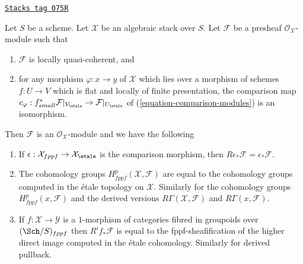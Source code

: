 \begin{lemma}
\label{stacks-sheaves-lemma-compare-fppf-etale}
\href{https://stacks.math.columbia.edu/tag/075R}{\texttt{Stacks tag 075R}}

Let $S$ be a scheme. Let $\mathcal{X}$ be an algebraic stack over $S$.
Let $\mathcal{F}$ be a presheaf $\mathcal{O}_\mathcal{X}$-module such that
\begin{enumerate}
\item[(a)] $\mathcal{F}$ is locally quasi-coherent, and
\item[(b)] for any morphism $\varphi : x \to y$ of $\mathcal{X}$ which lies
over a morphism of schemes $f : U \to V$ which is flat and
locally of finite presentation, the comparison map
$c_\varphi : f_{small}^*\mathcal{F}|_{V_\etale} \to
\mathcal{F}|_{U_\etale}$ of
(\ref{equation-comparison-modules}) is an isomorphism.
\end{enumerate}
Then $\mathcal{F}$ is an $\mathcal{O}_\mathcal{X}$-module and
we have the following
\begin{enumerate}
\item If $\epsilon : \mathcal{X}_{fppf} \to \mathcal{X}_\etale$
is the comparison morphism, then
$R\epsilon_*\mathcal{F} = \epsilon_*\mathcal{F}$.
\item The cohomology groups $H^p_{fppf}(\mathcal{X}, \mathcal{F})$ are equal
to the cohomology groups computed in the \'etale topology on $\mathcal{X}$.
Similarly for the cohomology groups $H^p_{fppf}(x, \mathcal{F})$ and the
derived versions $R\Gamma(\mathcal{X}, \mathcal{F})$ and
$R\Gamma(x, \mathcal{F})$.
\item If $f : \mathcal{X} \to \mathcal{Y}$ is a $1$-morphism of
categories fibred in groupoids over $(\Sch/S)_{fppf}$ then
$R^if_*\mathcal{F}$ is equal to the fppf-sheafification of the
higher direct image computed in the \'etale cohomology.
Similarly for derived pullback.
\end{enumerate}
\end{lemma}

